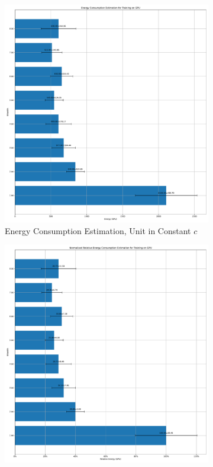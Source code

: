         \begin{figure}[H]
            \centering
            \begin{subfigure}[H]{0.48\textwidth}
                \includegraphics[width=\textwidth]{../standard/DVSGesture/plots/dvsgesture_train_energy_gpu.pdf}
                \caption{Energy Consumption Estimation, Unit in Constant $c$}
            \end{subfigure}
            \hfill
            \begin{subfigure}[H]{0.48\textwidth}
                \includegraphics[width=\textwidth]{../standard/DVSGesture/plots/dvsgesture_train_relative_energy_gpu.pdf}

\end{subfigure}
\end{figure}
